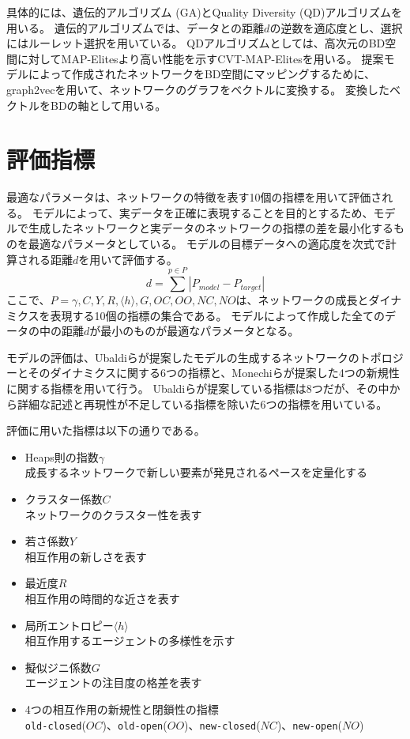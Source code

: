 \documentclass[uplatex,11pt,openany]{ujreport}
\begin{document}
        具体的には、遺伝的アルゴリズム (GA)とQuality Diversity (QD)アルゴリズムを用いる。
        遺伝的アルゴリズムでは、データとの距離$d$の逆数を適応度とし、選択にはルーレット選択を用いている。
        QDアルゴリズムとしては、高次元のBD空間に対してMAP-Elitesより高い性能を示すCVT-MAP-Elitesを用いる。
        提案モデルによって作成されたネットワークをBD空間にマッピングするために、graph2vecを用いて、ネットワークのグラフをベクトルに変換する。
        変換したベクトルをBDの軸として用いる。


    \section{評価指標}
        最適なパラメータは、ネットワークの特徴を表す10個の指標を用いて評価される。
        モデルによって、実データを正確に表現することを目的とするため、モデルで生成したネットワークと実データのネットワークの指標の差を最小化するものを最適なパラメータとしている。
        モデルの目標データへの適応度を次式で計算される距離$d$を用いて評価する。
        \begin{equation}
            d = \sum^{p\in P}|P_{model}-P_{target}|
        \end{equation}
        ここで、$P={\gamma,C,Y,R, \langle h\rangle ,G,OC,OO,NC,NO}$は、ネットワークの成長とダイナミクスを表現する10個の指標の集合である。
        モデルによって作成した全てのデータの中の距離$d$が最小のものが最適なパラメータとなる。

        モデルの評価は、Ubaldiらが提案したモデルの生成するネットワークのトポロジーとそのダイナミクスに関する6つの指標\cite{ubaldiEmergenceEvolutionSocial2021}と、Monechiらが提案した4つの新規性に関する指標\cite{monechiWavesNoveltiesExpansion2017}を用いて行う。
        Ubaldiらが提案している指標は8つだが、その中から詳細な記述と再現性が不足している指標を除いた6つの指標を用いている。

        評価に用いた指標は以下の通りである。
        \begin{itemize}
            \item Heaps則の指数$\gamma$\\成長するネットワークで新しい要素が発見されるペースを定量化する
            \item クラスター係数$C$\\ネットワークのクラスター性を表す
            \item 若さ係数$Y$\\相互作用の新しさを表す
            \item 最近度$R$\\相互作用の時間的な近さを表す
            \item 局所エントロピー$\langle h\rangle$\\相互作用するエージェントの多様性を示す
            \item 擬似ジニ係数$G$\\エージェントの注目度の格差を表す
            \item 4つの相互作用の新規性と閉鎖性の指標\\\verb|old-closed|($OC$)、\verb|old-open|($OO$)、\verb|new-closed|($NC$)、\verb|new-open|($NO$)
        \end{itemize}
\end{document}
